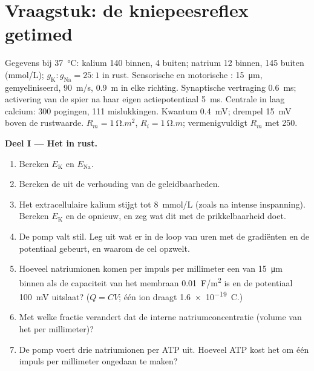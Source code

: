 \section{Vraagstuk: de kniepeesreflex getimed}

\begin{problem}
\label{pb:b2:neurons-synapses:1}
Gegevens bij \qty{37}{\celsius}: kalium 140 binnen, 4 buiten; natrium 12
binnen, 145 buiten (\unit{mmol/L}); $g_{\mathrm K} : g_{\mathrm{Na}} = 25 : 1$
in rust. Sensorische en motorische : \qty{15}{\micro m}, gemyeliniseerd,
\qty{90}{m/s}, \qty{0.9}{m} in elke richting. Synaptische vertraging
\qty{0.6}{ms}; activering van de spier na haar eigen actiepotentiaal
\qty{5}{ms}. Centrale  in laag calcium: 300 pogingen, 111
mislukkingen. Kwantum \qty{0.4}{mV}; drempel \qty{15}{mV} boven de rustwaarde. $R_m =
\qty{1}{\ohm.m^2}$, $R_i = \qty{1}{\ohm.m}$;  vermenigvuldigt $R_m$
met 250.

\medskip
\noindent\textbf{Deel I --- Het  in rust.}
\begin{enumerate}
  \item Bereken $E_{\mathrm K}$ en $E_{\mathrm{Na}}$.
  \item Bereken de  uit de verhouding van de geleidbaarheden.
  \item Het extracellulaire kalium stijgt tot \qty{8}{mmol/L} (zoals na
        intense inspanning). Bereken $E_{\mathrm K}$ en de 
        opnieuw, en zeg wat dit met de prikkelbaarheid doet.
  \item De pomp valt stil. Leg uit wat er in de loop van uren met de
        gradiënten en de potentiaal gebeurt, en waarom de cel opzwelt.
  \item Hoeveel natriumionen komen per impuls per millimeter een  van
        \qty{15}{\micro m} binnen als de capaciteit van het membraan
        \qty{0.01}{F/m^2} is en de potentiaal \qty{100}{mV} uitslaat?
        ($Q = CV$; één ion draagt \qty{1.6e-19}{C}.)
  \item Met welke fractie verandert dat de interne natriumconcentratie
        (volume van het  per millimeter)?
  \item De pomp voert drie natriumionen per ATP uit. Hoeveel ATP kost het
        om één impuls per millimeter  ongedaan te maken?
\end{enumerate}


\end{problem}
